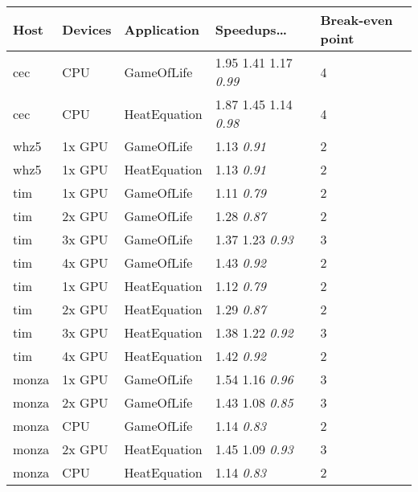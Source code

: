 \begin{table}
\footnotesize
\centering
\begin{tabular}{| l | l | l | l | l |}
\hline
\textbf{Host} & \textbf{Devices} & \textbf{Application} & \textbf{Speedups\ldots} & \textbf{Break-even point}\\
\hline
cec & CPU & GameOfLife & 1.95 1.41 1.17 \textit{0.99} & 4 \\
cec & CPU & HeatEquation & 1.87 1.45 1.14 \textit{0.98} & 4 \\
whz5 & 1x GPU & GameOfLife & 1.13 \textit{0.91} & 2 \\
whz5 & 1x GPU & HeatEquation & 1.13 \textit{0.91} & 2 \\
tim & 1x GPU & GameOfLife & 1.11 \textit{0.79} & 2 \\
tim & 2x GPU & GameOfLife & 1.28 \textit{0.87} & 2 \\
tim & 3x GPU & GameOfLife & 1.37 1.23 \textit{0.93} & 3 \\
tim & 4x GPU & GameOfLife & 1.43 \textit{0.92} & 2 \\
tim & 1x GPU & HeatEquation & 1.12 \textit{0.79} & 2 \\
tim & 2x GPU & HeatEquation & 1.29 \textit{0.87} & 2 \\
tim & 3x GPU & HeatEquation & 1.38 1.22 \textit{0.92} & 3 \\
tim & 4x GPU & HeatEquation & 1.42 \textit{0.92} & 2 \\
monza & 1x GPU & GameOfLife & 1.54 1.16 \textit{0.96} & 3 \\
monza & 2x GPU & GameOfLife & 1.43 1.08 \textit{0.85} & 3 \\
monza & CPU & GameOfLife & 1.14 \textit{0.83} & 2 \\
monza & 2x GPU & HeatEquation & 1.45 1.09 \textit{0.93} & 3 \\
monza & CPU & HeatEquation & 1.14 \textit{0.83} & 2 \\
\hline
\end{tabular}
\caption{}
\label{tab:breakeven}
\end{table}


